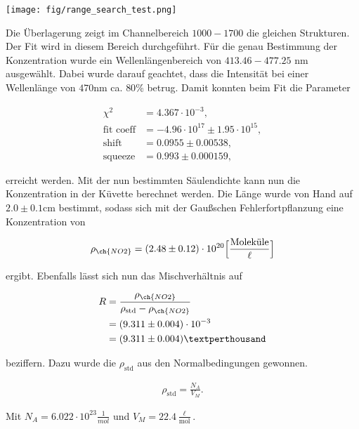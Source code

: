 \documentclass[12pt, a4paper, bibliography=totoc]{scrartcl}
\begin{document}
\begin{multicols}{2}
\begin{center}
	\texttt{[image: fig/range\_search\_test.png]}
	\label{fig:range_search}
\end{center}

Die Überlagerung zeigt im Channelbereich $1000-1700$ die gleichen Strukturen. Der Fit wird in diesem Bereich durchgeführt.
Für die genau Bestimmung der  Konzentration wurde ein Wellenlängenbereich von $413.46 - 477.25$ \si{nm} ausgewählt.
Dabei wurde darauf geachtet, dass die Intensität bei einer Wellenlänge von $470$\si{nm} ca. $80$\% betrug.
Damit konnten beim Fit die Parameter

\begin{align}
	\chi^2 &= 4.367 \cdot 10^{-3},\\
    \text{fit coeff} &= -4.96 \cdot 10^{17} \pm 1.95 \cdot 10^{15},\\
    \text{shift} &= 0.0955 \pm 0.00538,\\
    \text{squeeze} &= 0.993 \pm 0.000159, 
\end{align}

erreicht werden.
Mit der nun bestimmten Säulendichte kann nun die  Konzentration in der Küvette berechnet werden.
Die Länge wurde von Hand auf $2.0 \pm 0.1$\si{cm} bestimmt, sodass sich mit der Gaußschen Fehlerfortpflanzung eine Konzentration von

\begin{align}
    \rho_{\ch{NO2}} = (2.48 \pm 0.12) \cdot 10^{20} \Bigl[ \frac{\text{Moleküle}}{\ell}\Bigr]
\end{align}

ergibt.	
Ebenfalls lässt sich nun das Mischverhältnis auf

\begin{align}
    R &= \frac{\rho_{\ch{NO2}}}{\rho_{\text{std}}-\rho_{\ch{NO2}}}\\ 
    &= (9.311 \pm 0.004) \cdot 10^{-3}\\
    &= (9.311 \pm 0.004) \textperthousand
\end{align}

beziffern. Dazu wurde die $\rho_{\text{std}}$ aus den Normalbedingungen gewonnen.

\begin{align}
    \rho_{\text{std}} = \frac{N_A}{V_M}.
\end{align}
 	
Mit $N_A = 6.022 \cdot 10^{23} \frac{1}{\si{mol}}$ und $V_M = 22.4 \frac{\ell}{\si{\mol}}$.


\end{multicols}
\end{document}
